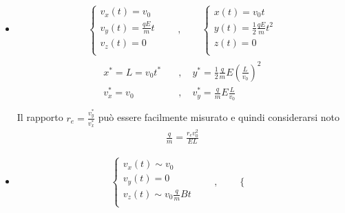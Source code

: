 \documentclass[letterpaper,10pt,italian]{jupyterBook}
\begin{document}
\begin{itemize}
\item {} 
\sphinxAtStartPar
{}
\begin{equation*}
\begin{split}
   \begin{cases}
     v_x(t) = v_0 \\
     v_y(t) = \frac{q E}{m} t \\
     v_z(t) =   0 \\
   \end{cases}
   \qquad , \qquad
   \begin{cases}
     x(t) = v_0 t \\
     y(t) = \frac{1}{2} \frac{q E}{m} t^2 \\
     z(t) =   0   \\
   \end{cases}
   \end{split}
\end{equation*}\begin{equation*}
\begin{split}\begin{aligned} 
       x^* = L = v_0 t^* \quad & , \quad   y^* = \frac{1}{2} \frac{q}{m} E \left( \frac{L}{v_0} \right)^2 \\
     v_x^* = v_0         \quad & , \quad v_y^* =             \frac{q}{m} E \frac{L}{v_0} \\
   \end{aligned}\end{split}
\end{equation*}
\sphinxAtStartPar
Il rapporto \(r_e = \frac{v_y^*}{v_x^*}\) può essere facilmente misurato e quindi considerarsi noto
\begin{equation*}
\begin{split}\frac{q}{m} = \frac{r_e v_0^2}{E L} \end{split}
\end{equation*}
\item {} 
\sphinxAtStartPar
{}
\begin{equation*}
\begin{split}\begin{cases}
  v_x(t) \sim v_0  \\
  v_y(t) = 0 \\
  v_z(t) \sim v_0 \frac{q}{m} B t \\
  \end{cases}
  \qquad , \qquad
  \begin{cases}

\end{cases}
\end{split}
\end{equation*}
\end{itemize}
\end{document}
